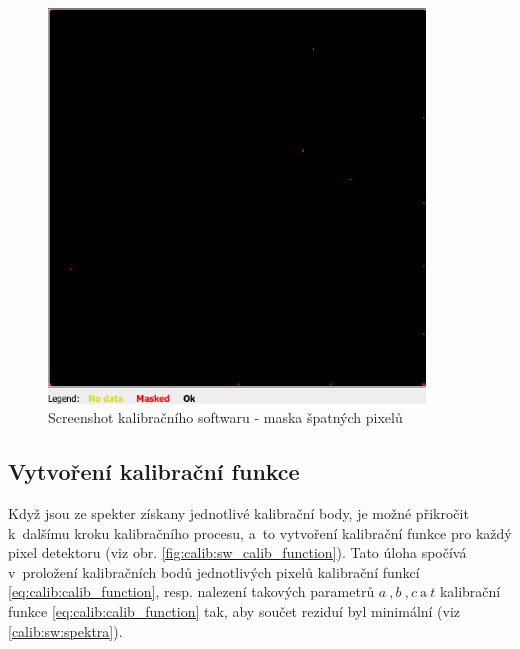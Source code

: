 \begin{figure}[th!]
	\begin{center}
		\includegraphics[width=10cm]{figures/calibsw_mask.png}
		\caption{Screenshot kalibračního softwaru - maska špatných pixelů}
		\label{fig:calib:sw_mask}
	\end{center}
\end{figure}


\subsection{Vytvoření kalibrační funkce}
Když jsou ze spekter získany jednotlivé kalibrační body, je možné přikročit k~dalšímu kroku kalibračního procesu, a~to vytvoření kalibrační funkce pro každý pixel detektoru (viz obr. \ref{fig:calib:sw_calib_function}). Tato úloha spočívá v~proložení kalibračních bodů jednotlivých pixelů kalibrační funkcí \ref{eq:calib:calib_function}, resp. nalezení takových parametrů $a~,b~,c~\text{a}~t$ kalibrační funkce \ref{eq:calib:calib_function} tak, aby součet reziduí byl minimální (viz \ref{calib:sw:spektra}).


